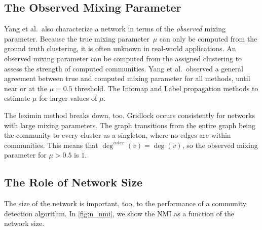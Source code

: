 \subsection{The Observed Mixing Parameter}
%

Yang et al.\ also characterize a network in terms of the \emph{observed} mixing parameter. Because the true mixing parameter~$\mu$ can only be computed from the ground truth clustering, it is often unknown in real-world applications. An observed mixing parameter can be computed from the assigned clustering to assess the strength of computed communities. Yang et al.\ observed a general agreement between true and computed mixing parameter for all methods, until near or at the $\mu = 0.5$ threshold. The Infomap and Label propagation methods  to estimate $\mu$ for larger values of $\mu$.

The leximin method breaks down, too. Gridlock occurs consistently for networks with large mixing parameters. The graph transitions from the entire graph being the community to every cluster as a singleton, where no edges are within communities. This means that $\deg^{inter}(v) =  \deg(v)$, so the observed mixing parameter for $\mu > 0.5$ is $1$.



\subsection{The Role of Network Size}

The size of the network is important, too, to the performance of a community detection algorithm. In \autoref{fig:n_nmi}, we show the NMI as a function of the network size.

